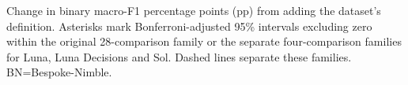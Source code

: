 \caption{Change in binary macro-F1 percentage points (pp) from adding the dataset's definition. Asterisks mark Bonferroni-adjusted 95\% intervals excluding zero within the original 28-comparison family or the separate four-comparison families for Luna, Luna Decisions and Sol. Dashed lines separate these families. BN=Bespoke-Nimble.}
